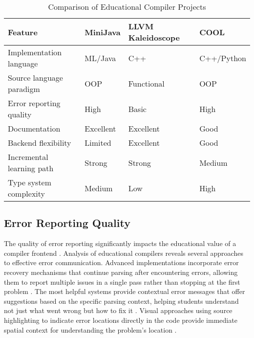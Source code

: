 \begin{table}[ht!]
    \centering
    \caption{Comparison of Educational Compiler Projects}
    \label{tab:edu-compiler-comparison}
    \begin{tabularx}{\textwidth}{|
        >{\raggedright\arraybackslash}p{2.5cm}|
        >{\centering\arraybackslash}X|
        >{\centering\arraybackslash}X|
        >{\centering\arraybackslash}X|
      }
      \hline
      \textbf{Feature} & \textbf{MiniJava} & \textbf{LLVM Kaleidoscope} & \textbf{COOL} \\
      \hline
      Implementation language     & ML/Java       & C++              & C++/Python         \\
      \hline
      Source language paradigm    & OOP           & Functional       & OOP                \\
      \hline
      Error reporting quality     & High          & Basic            & High               \\
      \hline
      Documentation              & Excellent     & Excellent        & Good               \\
      \hline
      Backend flexibility        & Limited       & Excellent        & Good               \\
      \hline
      Incremental learning path  & Strong        & Strong           & Medium             \\
      \hline
      Type system complexity     & Medium        & Low              & High               \\
      \hline
    \end{tabularx}
\end{table}


\subsection{Error Reporting Quality}

The quality of error reporting significantly impacts the educational value of a compiler frontend \cite{traver2010compiler}. Analysis of educational compilers reveals several approaches to effective error communication. Advanced implementations incorporate error recovery mechanisms that continue parsing after encountering errors, allowing them to report multiple issues in a single pass rather than stopping at the first problem \cite{aho2007compilers}. The most helpful systems provide contextual error messages that offer suggestions based on the specific parsing context, helping students understand not just what went wrong but how to fix it \cite{traver2010compiler}. Visual approaches using source highlighting to indicate error locations directly in the code provide immediate spatial context for understanding the problem's location \cite{horwitz2007student}.


